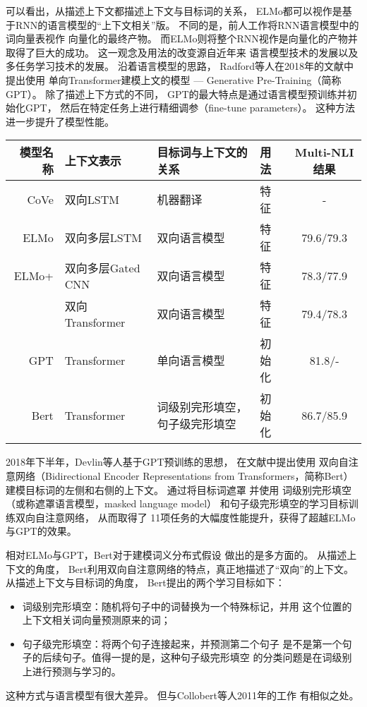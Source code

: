 可以看出，从描述上下文都描述上下文与目标词的关系，
ELMo都可以视作是基于RNN的语言模型的``上下文相关''版。
不同的是，前人工作将RNN语言模型中的词向量表视作
向量化的最终产物。
而ELMo则将整个RNN视作是向量化的产物并取得了巨大的成功。
这一观念及用法的改变源自近年来
语言模型技术的发展以及
多任务学习技术的发展。
沿着语言模型的思路，
Radford等人在2018年的文献中提出使用
单向Transformer建模上文的模型 --- Generative Pre-Training（简称GPT）。
除了描述上下方式的不同，
GPT的最大特点是通过语言模型预训练并初始化GPT，
然后在特定任务上进行精细调参（fine-tune parameters）。
这种方法进一步提升了模型性能。

\begin{table}[t]
	\label{tbl:intro:context-emb}
	\vspace{0.5em}\centering\wuhao
	\begin{tabular}{r lp{3.8cm}lc}
		\toprule[1.5pt]
		模型名称 &上下文表示 & 目标词与上下文的关系 & 用法 & Multi-NLI结果 \\
		\midrule[1pt]
		CoVe & 双向LSTM &  机器翻译& 特征 & - \\
		ELMo & 双向多层LSTM &  双向语言模型 & 特征 & 79.6/79.3 \\
		ELMo+ & 双向多层Gated CNN  & 双向语言模型 & 特征& 78.3/77.9 \\
		& 双向Transformer  & 双向语言模型 & 特征& 79.4/78.3 \\
		GPT & Transformer   & 单向语言模型 & 初始化& 81.8/- \\
		Bert & Transformer & 词级别完形填空，句子级完形填空 & 初始化 & 86.7/85.9
\\
		\bottomrule[1.5pt]
	\end{tabular}
\end{table}


2018年下半年，Devlin等人基于GPT预训练的思想，
在文献中提出使用
双向自注意网络（Bidirectional Encoder Representations from Transformers，简称Bert）建模目标词的左侧和右侧的上下文。
通过将目标词遮罩
并使用
词级别完形填空（或称遮罩语言模型，masked language model）
和句子级完形填空的学习目标训练双向自注意网络，
从而取得了
11项任务的大幅度性能提升，获得了超越ELMo与GPT的效果。

相对ELMo与GPT，Bert对于建模词义分布式假设
做出的是多方面的。
从描述上下文的角度，
Bert利用双向自注意网络的特点，真正地描述了``双向''的上下文。
从描述上下文与目标词的角度，
Bert提出的两个学习目标如下：
\begin{itemize}
	\item 词级别完形填空：随机将句子中的词替换为一个特殊标记，并用
	这个位置的上下文相关词向量预测原来的词；
	\item 句子级完形填空：将两个句子连接起来，并预测第二个句子
	是不是第一个句子的后续句子。值得一提的是，这种句子级完形填空
	的分类问题是在词级别上进行预测与学习的。
\end{itemize}
这种方式与语言模型有很大差异。
但与Collobert等人2011年的工作
有相似之处。

